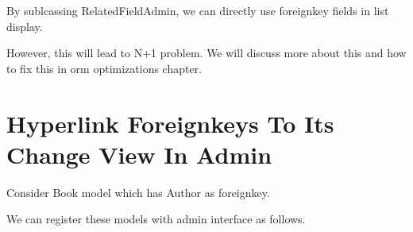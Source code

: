 \documentclass[letterpaper,12pt,english]{sphinxmanual}
\begin{document}
By sublcassing RelatedFieldAdmin, we can directly use foreignkey fields in list display.

However, this will lead to N+1 problem. We will discuss more about this and how to fix this in orm optimizations chapter.


\chapter{Hyperlink Foreignkeys To Its Change View In Admin}
\label{\detokenize{admin_hyperlink_foreignkey:hyperlink-foreignkeys-to-its-change-view-in-admin}}\label{\detokenize{admin_hyperlink_foreignkey::doc}}
Consider Book model which has Author as foreignkey.

\begin{sphinxVerbatim}[commandchars=\\\{\}]
   


 
      

 
      
      
\end{sphinxVerbatim}

We can register these models with admin interface as follows.

\begin{sphinxVerbatim}[commandchars=\\\{\}]
   

    

 
        

 
\end{sphinxVerbatim}
\end{document}
